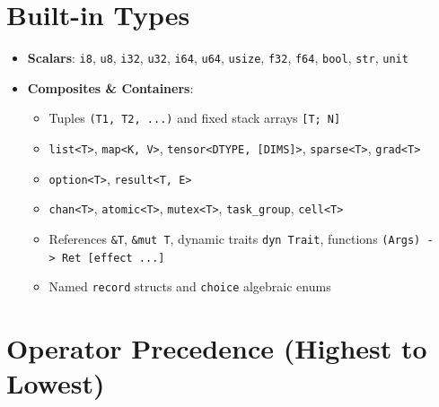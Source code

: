 \documentclass[
  english,
  oneside]{book}
\providecommand{\tightlist}{%
  \setlength{\itemsep}{0pt}\setlength{\parskip}{0pt}}
\begin{document}
\section{Built-in Types}\label{built-in-types}

\begin{itemize}
\tightlist
\item
  \textbf{Scalars}: \texttt{i8}, \texttt{u8}, \texttt{i32},
  \texttt{u32}, \texttt{i64}, \texttt{u64}, \texttt{usize},
  \texttt{f32}, \texttt{f64}, \texttt{bool}, \texttt{str}, \texttt{unit}
\item
  \textbf{Composites \& Containers}:

  \begin{itemize}
  \tightlist
  \item
    Tuples \texttt{(T1,\ T2,\ ...)} and fixed stack arrays
    \texttt{{[}T;\ N{]}}
  \item
    \texttt{list\textless{}T\textgreater{}},
    \texttt{map\textless{}K,\ V\textgreater{}},
    \texttt{tensor\textless{}DTYPE,\ {[}DIMS{]}\textgreater{}},
    \texttt{sparse\textless{}T\textgreater{}},
    \texttt{grad\textless{}T\textgreater{}}
  \item
    \texttt{option\textless{}T\textgreater{}},
    \texttt{result\textless{}T,\ E\textgreater{}}
  \item
    \texttt{chan\textless{}T\textgreater{}},
    \texttt{atomic\textless{}T\textgreater{}},
    \texttt{mutex\textless{}T\textgreater{}}, \texttt{task\_group},
    \texttt{cell\textless{}T\textgreater{}}
  \item
    References \texttt{\&T}, \texttt{\&mut\ T}, dynamic traits
    \texttt{dyn\ Trait}, functions
    \texttt{(Args)\ -\textgreater{}\ Ret\ {[}effect\ ...{]}}
  \item
    Named \texttt{record} structs and \texttt{choice} algebraic enums
  \end{itemize}
\end{itemize}

\section{Operator Precedence (Highest to
Lowest)}\label{operator-precedence-highest-to-lowest}
\end{document}
